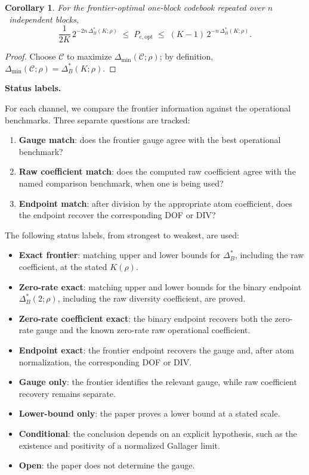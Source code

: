 \documentclass[lettersize,onecolumn]{IEEEtran}
\newtheorem{corollary}{Corollary}
\newcommand{\snr}{\rho}
\newcommand{\setC}{\mathcal{C}}
\begin{document}
\begin{corollary}\label{cor:optimal_packing}
For the frontier-optimal one-block codebook repeated over
$n$~independent blocks,
\begin{equation}\label{eq:closest_pair}
\frac{1}{2K}\,2^{-2n\,\Delta_B^*(K;\snr)}
\;\le\; P_{e,\mathrm{opt}}
\;\le\; (K-1)\,2^{-n\,\Delta_B^*(K;\snr)}.
\end{equation}
\end{corollary}
\begin{proof}
Choose $\setC$ to maximize $\Delta_{\min}(\setC;\snr)$; by
definition, $\Delta_{\min}(\setC;\snr) = \Delta_B^*(K;\snr)$.
\end{proof}

\textbf{Status labels.}

For each channel, we compare the frontier information
against the operational benchmarks. Three separate questions are
tracked:

\begin{enumerate}
\item \textbf{Gauge match}: does the frontier gauge agree with the
best operational benchmark?
\item \textbf{Raw coefficient match}: does the computed raw
coefficient agree with the named comparison benchmark, when one is
being used?
\item \textbf{Endpoint match}: after division by the appropriate atom
coefficient, does the endpoint recover the corresponding DOF or DIV?
\end{enumerate}

The following status labels, from strongest to weakest, are used:

\begin{itemize}
\item \textbf{Exact frontier}: matching upper and lower bounds
for $\Delta_B^*$, including the raw coefficient, at the stated
$K(\snr)$.
\item \textbf{Zero-rate exact}: matching upper and lower
bounds for the binary endpoint $\Delta_B^*(2;\snr)$, including the
raw diversity coefficient, are proved.
\item \textbf{Zero-rate coefficient exact}: the binary endpoint
recovers both the zero-rate gauge and the known zero-rate raw
operational coefficient.
\item \textbf{Endpoint exact}: the frontier endpoint recovers the
gauge and, after atom normalization, the corresponding DOF or DIV.
\item \textbf{Gauge only}: the frontier identifies the relevant
gauge, while raw coefficient recovery remains separate.
\item \textbf{Lower-bound only}: the paper proves a lower bound at
a stated scale.
\item \textbf{Conditional}: the conclusion depends on an explicit
hypothesis, such as the existence and positivity of a normalized
Gallager limit.
\item \textbf{Open}: the paper does not determine the gauge.
\end{itemize}
\end{document}
